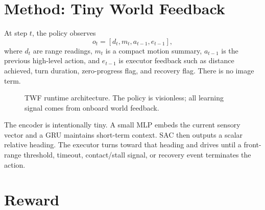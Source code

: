 \documentclass{article}
\begin{document}
\section{Method: Tiny World Feedback}

At step $t$, the policy observes
\begin{equation}
o_t = [d_t, m_t, a_{t-1}, e_{t-1}],
\end{equation}
where $d_t$ are range readings, $m_t$ is a compact motion summary, $a_{t-1}$ is the previous high-level action, and $e_{t-1}$ is executor feedback such as distance achieved, turn duration, zero-progress flag, and recovery flag. There is no image term.

\begin{figure}[h]
  \centering
  \caption{TWF runtime architecture. The policy is visionless; all learning signal comes from onboard world feedback.}
  \label{fig:twf-architecture}
\end{figure}

The encoder is intentionally tiny. A small MLP embeds the current sensory vector and a GRU maintains short-term context. SAC then outputs a scalar relative heading. The executor turns toward that heading and drives until a front-range threshold, timeout, contact/stall signal, or recovery event terminates the action.

\section{Reward}
\end{document}
